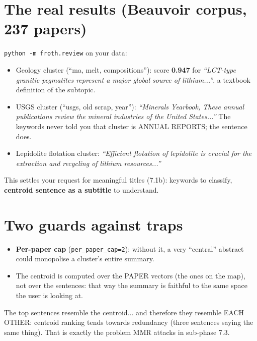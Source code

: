 \documentclass[11pt,a4paper]{article}
\begin{document}
\section{The real results (Beauvoir corpus, 237 papers)}

\texttt{python -m froth.review} on your data:

\begin{itemize}
  \item Geology cluster (``ma, melt, compositions''): score \textbf{0.947} for
        \emph{``LCT-type granitic pegmatites represent a major global source of
        lithium...''}, a textbook definition of the subtopic.
  \item USGS cluster (``usgs, old scrap, year''): \emph{``Minerals Yearbook, These annual
        publications review the mineral industries of the United States...''} The keywords
        never told you that cluster is ANNUAL REPORTS; the sentence does.
  \item Lepidolite flotation cluster: \emph{``Efficient flotation of lepidolite is crucial for
        the extraction and recycling of lithium resources...''}
\end{itemize}

This settles your request for meaningful titles (7.1b): keywords to classify, \textbf{centroid
sentence as a subtitle} to understand.

\section{Two guards against traps}

\begin{itemize}
  \item \textbf{Per-paper cap} (\texttt{per\_paper\_cap=2}): without it, a very ``central''
        abstract could monopolise a cluster's entire summary.
  \item The centroid is computed over the PAPER vectors (the ones on the map), not over the
        sentences: that way the summary is faithful to the same space the user is looking at.
\end{itemize}

\begin{ojo}
The top sentences resemble the centroid... and therefore they resemble EACH OTHER: centroid
ranking tends towards redundancy (three sentences saying the same thing). That is exactly the
problem MMR attacks in sub-phase 7.3.
\end{ojo}
\end{document}
